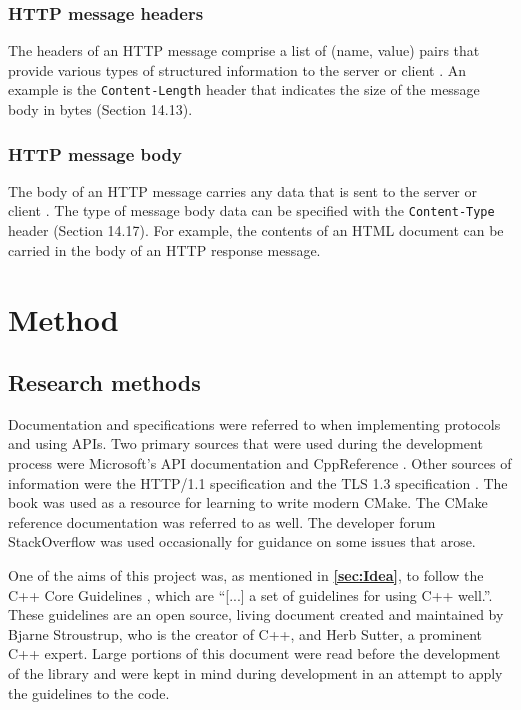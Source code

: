 \documentclass[12pt, a4paper]{article}
\begin{document}
\subsubsection{HTTP message headers}
The headers of an HTTP message comprise a list of (name, value) pairs that provide various types of structured information to the server or client \parencite[][Section 4.2]{HttpSpec}. An example is the \texttt{Content-Length} header that indicates the size of the message body in bytes (Section 14.13).

\subsubsection{HTTP message body}
The body of an HTTP message carries any data that is sent to the server or client \parencite[][Section 4.3]{HttpSpec}. The type of message body data can be specified with the \texttt{Content-Type} header (Section 14.17). For example, the contents of an HTML document can be carried in the body of an HTTP response message.

\clearpage
\section{Method}
\subsection{Research methods}
Documentation and specifications were referred to when implementing protocols and using APIs. Two primary sources that were used during the development process were Microsoft’s API documentation \parencite{MicrosoftDocs} and CppReference \parencite{CppReference}. Other sources of information were the HTTP/1.1 specification \parencite{HttpSpec} and the TLS 1.3 specification \parencite{TlsSpec}. The book  \parencite{ModernCMakeBook} was used as a resource for learning to write modern CMake. The CMake reference documentation \parencite{CMakeReference} was referred to as well. The developer forum StackOverflow \parencite*{StackOverflow} was used occasionally for guidance on some issues that arose. 

One of the aims of this project was, as mentioned in \textbf{\ref{sec:Idea}}, to follow the C++ Core Guidelines \parencite{CppCoreGuidelines}, which are “[...] a set of guidelines for using C++ well.”. These guidelines are an open source, living document created and maintained by Bjarne Stroustrup, who is the creator of C++, and Herb Sutter, a prominent C++ expert. Large portions of this document were read before the development of the library and were kept in mind during development in an attempt to apply the guidelines to the code.
\end{document}
